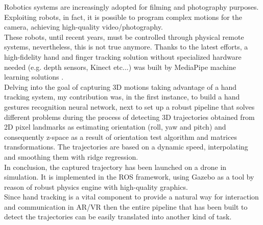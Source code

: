 Robotics systems are increasingly adopted for filming and photography purposes. Exploiting robots, in fact, it is possible to program complex motions for the camera, achieving high-quality video/photography. \\ 

\noindent These robots, until recent years, must be controlled through physical remote systems, nevertheless, this is not true anymore. Thanks to the latest efforts, a high-fidelity hand and finger tracking solution without specialized hardware needed (e.g. depth sensors, Kinect etc...) was built by MediaPipe machine learning solutions \cite[]{zhang2020mediapipe}.\\

\noindent Delving into the goal of capturing 3D motions taking advantage of a hand tracking system, my contribution was, in the first instance, to build a hand gestures recognition neural network, next to set up a robust pipeline that solves different problems during the process of detecting 3D trajectories obtained from 2D pixel landmarks as estimating orientation (roll, yaw and pitch) and consequently z-space as a result of orientation test algorithm and matrices transformations. The trajectories are based on a dynamic speed, interpolating and smoothing them with ridge regression. \\

\noindent In conclusion, the captured trajectory has been launched on a drone in simulation. It is implemented in the ROS framework, using Gazebo as a tool by reason of robust physics engine with high-quality graphics. \\

\noindent Since hand tracking is a vital component to provide a natural way for interaction and communication in AR/VR then the entire pipeline that has been built to detect the trajectories can be easily translated into another kind of task.

